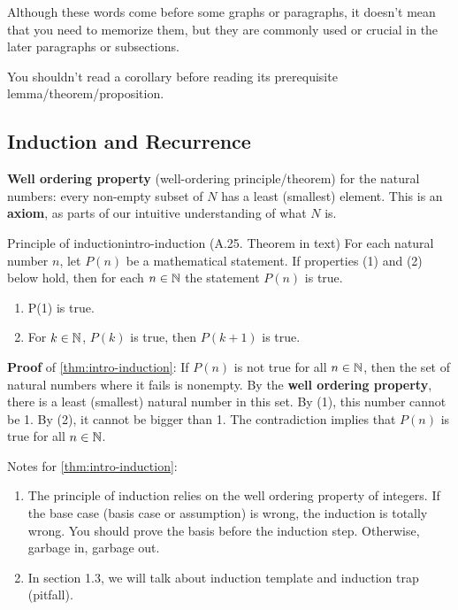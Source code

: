 \documentclass[../src/handouts/main.tex]{subfiles}
\begin{document}
Although these words come before some graphs or paragraphs, it doesn't mean that you need to memorize them, but they are commonly used or crucial in the later paragraphs or subsections.

You shouldn't read a corollary before reading its prerequisite lemma/theorem/proposition.

\subsection{Induction and Recurrence}

\textbf{Well ordering property} (well-ordering principle/theorem) for the natural numbers: every non-empty subset of $N$ has a least (smallest) element.
This is an \textbf{axiom}, as parts of our intuitive understanding of what $N$ is.

\begin{theorem}{Principle of induction}{intro-induction}
  (A.25. Theorem in text)
  For each natural number $n$, let $P(n)$ be a mathematical statement.
  If properties (1) and (2) below hold, then for each $n \in \mathbb{N}$ the statement $P(n)$ is true.
  \begin{enumerate}
    \item P(1) is true.
    \item For $k \in \mathbb{N}$, $P(k)$ is true, then $P(k + 1)$ is true.
  \end{enumerate}
\end{theorem}

\textbf{Proof} of \cref{thm:intro-induction}:
If $P(n)$ is not true for all $n \in \mathbb{N}$, then the set of natural numbers where it fails is nonempty.
By the \textbf{well ordering property}, there is a least (smallest) natural number in this set.
By (1), this number cannot be 1.
By (2), it cannot be bigger than 1.
The contradiction implies that $P(n)$ is true for all $n \in \mathbb{N}$.

Notes for \cref{thm:intro-induction}:
\begin{enumerate}
  \item The principle of induction relies on the well ordering property of integers. If the base case (basis case or assumption) is wrong, the induction is totally wrong. You should prove the basis before the induction step. Otherwise, garbage in, garbage out.
  \item In section 1.3, we will talk about induction template and induction trap (pitfall). %
\end{enumerate}
\end{document}
